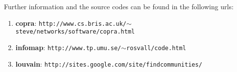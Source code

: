 \documentclass[11pt]{article}
\begin{document}
Further information and the source codes can be found in the following urls:

\begin{enumerate}

  \item \textbf{copra}: {\tt http://www.cs.bris.ac.uk/$\sim$steve/networks/software/copra.html}
  \item \textbf{infomap}: {\tt http://www.tp.umu.se/$\sim$rosvall/code.html}
  \item \textbf{louvain}: {\tt http://sites.google.com/site/findcommunities/}
  \end{enumerate}
\end{document}
